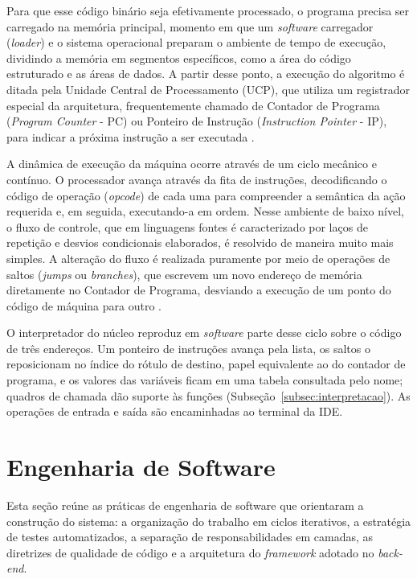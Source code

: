 Para que esse código binário seja efetivamente processado, o programa precisa ser carregado na memória principal, momento em que um \textit{software} carregador (\textit{loader}) e o sistema operacional preparam o ambiente de tempo de execução, dividindo a memória em segmentos específicos, como a área do código estruturado e as áreas de dados.
A partir desse ponto, a execução do algoritmo é ditada pela Unidade Central de Processamento (UCP), que utiliza um registrador especial da arquitetura, frequentemente chamado de Contador de Programa (\textit{Program Counter} - PC) ou Ponteiro de Instrução (\textit{Instruction Pointer} - IP), para indicar a próxima instrução a ser executada \cite{cooper2012}.

A dinâmica de execução da máquina ocorre através de um ciclo mecânico e contínuo. O processador avança através da fita de instruções, decodificando o código de operação (\textit{opcode}) de cada uma para compreender a semântica da ação requerida e, em seguida, executando-a em ordem.
Nesse ambiente de baixo nível, o fluxo de controle, que em linguagens fontes é caracterizado por laços de repetição e desvios condicionais elaborados, é resolvido de maneira muito mais simples.
A alteração do fluxo é realizada puramente por meio de operações de saltos (\textit{jumps} ou \textit{branches}), que escrevem um novo endereço de memória diretamente no Contador de Programa, desviando a execução de um ponto do código de máquina para outro \cite{nystrom2021}.

O interpretador do núcleo reproduz em \textit{software} parte desse ciclo sobre o código de três endereços. Um ponteiro de instruções avança pela lista, os saltos o reposicionam no índice do rótulo de destino, papel equivalente ao do contador de programa, e os valores das variáveis ficam em uma tabela consultada pelo nome; quadros de chamada dão suporte às funções (Subseção~\ref{subsec:interpretacao}). As operações de entrada e saída são encaminhadas ao terminal da IDE.


\section{Engenharia de Software}
\label{sec:engenharia-software}

Esta seção reúne as práticas de engenharia de software que orientaram a construção do sistema: a organização do trabalho em ciclos iterativos, a estratégia de testes automatizados, a separação de responsabilidades em camadas, as diretrizes de qualidade de código e a arquitetura do \textit{framework} adotado no \textit{back-end}.

